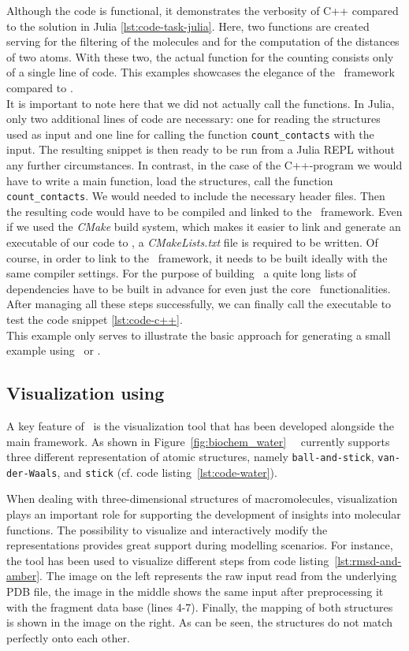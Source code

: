 Although the code is functional, it demonstrates the verbosity of C++ compared to the solution in Julia \ref{lst:code-task-julia}. Here, two functions are created serving for the filtering of the molecules and for the computation of the distances of two atoms. With these two, the actual function for the counting consists only of a single line of code. This examples showcases the elegance of the \biochem\ framework compared to \ball. \\

It is important to note here that we did not actually call the functions. In Julia, only two additional lines of code are necessary: one for reading the structures used as input and one line for calling the function  \texttt{count\_contacts} with the input. The resulting snippet is then ready to be run from a Julia REPL without any further circumstances. In contrast, in the case of the C++-program we would have to write a main function, load the structures, call the function \texttt{count\_contacts}. We would needed to include the necessary header files. Then the resulting code would have to be compiled and linked to the \ball\ framework. Even if we used the \textit{CMake} build system, which makes it easier to link and generate an executable of our code to \ball, a \textit{CMakeLists.txt} file is required to be written.  Of course, in order to link to the \ball\ framework, it needs to be built ideally with the same compiler settings. For the purpose of building \ball\ a quite long lists of dependencies have to be built in advance for even just the core \ball\ functionalities. After managing all these steps successfully, we can finally call the executable to test the code snippet \ref{lst:code-c++}. \\
This example only serves to illustrate the basic approach for generating a small example using \ball\ or \biochem.

\subsection{Visualization using \bioviz}

A key feature of \biochem\ is the visualization tool \textit{\bioviz} that
has been developed alongside the main framework. As shown in Figure~\ref{fig:biochem_water} \ \bioviz\ currently supports three different representation of atomic structures, namely \texttt{ball-and-stick}, \texttt{van-der-Waals}, and \texttt{stick} (cf. code listing~\ref{lst:code-water}).

When dealing with three-dimensional structures of macromolecules, visualization plays an important role for supporting the development of insights into molecular functions. The possibility to visualize and interactively modify the representations provides great support during modelling scenarios. For instance, the tool has been used to visualize different steps from code listing~\ref{lst:rmsd-and-amber}. The image on the left represents the raw input read from the underlying PDB file, the image in the middle shows the same input after preprocessing it with the fragment data base (lines 4-7). Finally, the mapping of both structures is shown in the image on the right. As can be seen, the structures do not match perfectly onto each other. 

